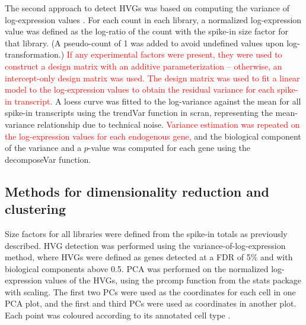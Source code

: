 \documentclass{article}
\newcommand\revised[1]{\textcolor{red}{#1}}
\begin{document}
The second approach to detect HVGs was based on computing the variance of log-expression values \citep{lun2016stepbystep}.
For each count in each library, a normalized log-expression value was defined as the log-ratio of the count with the spike-in size factor for that library.
(A pseudo-count of 1 was added to avoid undefined values upon log-transformation.)
\revised{If any experimental factors were present, they were used to construct a design matrix with an additive parameterization -- otherwise, an intercept-only design matrix was used.
The design matrix was used to fit a linear model to the log-expression values to obtain the residual variance for each spike-in transcript.}
A loess curve was fitted to the log-variance against the mean for all spike-in transcripts using the trendVar function in scran, representing the mean-variance relationship due to technical noise.
\revised{Variance estimation was repeated on the log-expression values for each endogenous gene,} and the biological component of the variance and a $p$-value was computed for each gene using the decomposeVar function.

\subsection{Methods for dimensionality reduction and clustering}
Size factors for all libraries were defined from the spike-in totals as previously described. 
HVG detection was performed using the variance-of-log-expression method, where HVGs were defined as genes detected at a FDR of 5\% and with biological components above 0.5.
PCA was performed on the normalized log-expression values of the HVGs, using the prcomp function from the stats package with scaling.
The first two PCs were used as the coordinates for each cell in one PCA plot, and the first and third PCs were used as coordinates in another plot.
Each point was coloured according to its annotated cell type \citep{segerstople2016single}.
\end{document}
